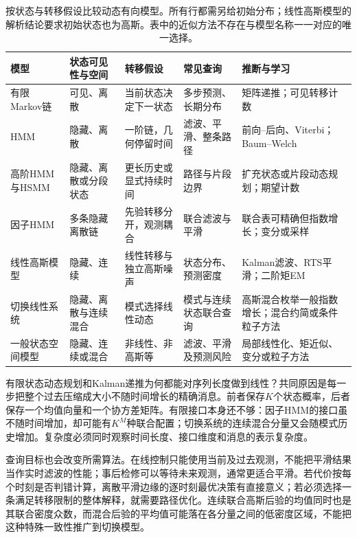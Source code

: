 \begin{table}[htbp]
  \centering
  \small
  \begin{tabularx}{\linewidth}{@{}p{25mm}p{23mm}p{29mm}p{27mm}X@{}}
    \toprule
    模型 & 状态可见性与空间 & 转移假设 & 常见查询 & 推断与学习 \\
    \midrule
    有限Markov链 & 可见、离散 & 当前状态决定下一状态 & 多步预测、长期分布 & 矩阵递推；可见转移计数 \\
    HMM & 隐藏、离散 & 一阶链，几何停留时间 & 滤波、平滑、整条路径 & 前向--后向、Viterbi；Baum--Welch \\
    高阶HMM与HSMM & 隐藏、离散或分段状态 & 更长历史或显式持续时间 & 路径与片段边界 & 扩充状态或片段动态规划；期望计数 \\
    因子HMM & 多条隐藏离散链 & 先验转移分开，观测耦合 & 联合滤波与平滑 & 联合表可精确但指数增长；变分或采样 \\
    线性高斯模型 & 隐藏、连续 & 线性转移与独立高斯噪声 & 状态分布、预测密度 & Kalman滤波、RTS平滑；二阶矩EM \\
    切换线性系统 & 隐藏、离散与连续混合 & 模式选择线性动态 & 模式与连续状态联合查询 & 高斯混合枚举一般指数增长；混合约简或条件粒子方法 \\
    一般状态空间模型 & 隐藏、连续或混合 & 非线性、非高斯等 & 滤波、平滑及预测风险 & 局部线性化、矩近似、变分或粒子方法 \\
    \bottomrule
  \end{tabularx}
  \caption{按状态与转移假设比较动态有向模型。所有行都需另给初始分布；线性高斯模型的解析结论要求初始状态也为高斯。表中的近似方法不存在与模型名称一一对应的唯一选择。}
  \label{tab:pgm-dynamic-models}
\end{table}

有限状态动态规划和Kalman递推为何都能对序列长度做到线性？共同原因是每一步把整个过去压缩成大小不随时间增长的精确消息。前者保存$K$个状态概率，后者保存一个均值向量和一个协方差矩阵。有限接口本身还不够：因子HMM的接口虽不随时间增加，却可能有$K^M$种联合配置；切换系统的连续混合分量又会随模式历史增加。复杂度必须同时观察时间长度、接口维度和消息的表示复杂度。

查询目标也会改变所需算法。在线控制只能使用当前及过去观测，不能把平滑结果当作实时滤波的性能；事后检修可以等待未来观测，通常更适合平滑。若代价按每个时刻是否判错计算，离散平滑边缘的逐时刻最优决策有直接意义；若必须选择一条满足转移限制的整体解释，就需要路径优化。连续联合高斯后验的均值同时也是其联合密度众数，而混合后验的平均值可能落在各分量之间的低密度区域，不能把这种特殊一致性推广到切换模型。

